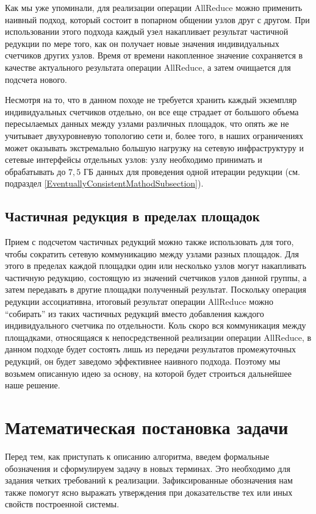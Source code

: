 \documentclass{article}
\theoremstyle{plain}
\theoremstyle{plain}
\theoremstyle{plain}
\theoremstyle{plain}
\theoremstyle{definition}
\theoremstyle{remark}
\theoremstyle{plain}
\begin{document}
Как мы уже упоминали, для реализации операции AllReduce можно применить наивный подход, который состоит в попарном общении узлов друг с другом. При использовании этого подхода каждый узел накапливает результат частичной редукции по мере того, как он получает новые значения индивидуальных счетчиков других узлов. Время от времени накопленное значение сохраняется в качестве актуального результата операции AllReduce, а затем очищается для подсчета нового.

Несмотря на то, что в данном походе не требуется хранить каждый экземпляр индивидуальных счетчиков отдельно, он все еще страдает от большого объема пересылаемых данных между узлами различных площадок, что опять же не учитывает двухуровневую топологию сети и, более того, в наших ограничениях может оказывать экстремально большую нагрузку на сетевую инфраструктуру и сетевые интерфейсы отдельных узлов: узлу необходимо принимать и обрабатывать до $7,5$ ГБ данных для проведения одной итерации редукции (см. подраздел \ref{EventuallyConsistentMathodSubsection}).

\subsection{Частичная редукция в пределах площадок}
\label{GroupReductionSubsection}

Прием с подсчетом частичных редукций можно также использовать для того, чтобы сократить сетевую коммуникацию между узлами разных площадок. Для этого в пределах каждой площадки один или несколько узлов могут накапливать частичную редукцию, состоящую из значений счетчиков узлов данной группы, а затем передавать в другие площадки полученный результат. Поскольку операция редукции ассоциативна, итоговый результат операции AllReduce можно \enquote{собирать} из таких частичных редукций вместо добавления каждого индивидуального счетчика по отдельности. Коль скоро вся коммуникация между площадками, относящаяся к непосредственной реализации операции AllReduce, в данном подходе будет состоять лишь из передачи результатов промежуточных редукций, он будет заведомо эффективнее наивного подхода. Поэтому мы возьмем описанную идею за основу, на которой будет строиться дальнейшее наше решение.

\section{Математическая постановка задачи}

Перед тем, как приступать к описанию алгоритма, введем формальные обозначения и сформулируем задачу в новых терминах. Это необходимо для задания четких требований к реализации. Зафиксированные обозначения нам также помогут ясно выражать утверждения при доказательстве тех или иных свойств построенной системы.
\end{document}
